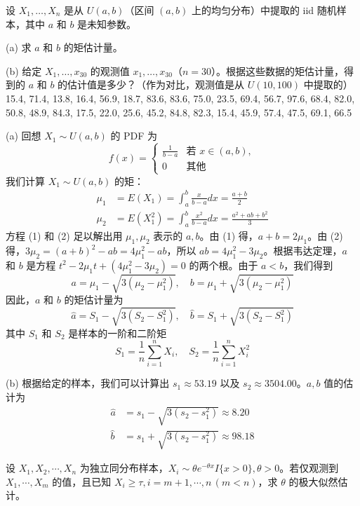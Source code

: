 \begin{questions}
\question 设 $X_1, \dots, X_n$ 是从 $U(a, b)$（区间 $(a, b)$ 上的均匀分布）中提取的 iid 随机样本，其中 $a$ 和 $b$ 是未知参数。

(a) 求 $a$ 和 $b$ 的矩估计量。

(b) 给定 $X_1, \dots, x_{30}$ 的观测值 $x_1, \dots, x_{30}$（$n = 30$）。根据这些数据的矩估计量，得到的 $a$ 和 $b$ 的估计值是多少？（作为对比，观测值是从 $U(10, 100)$ 中提取的）
15.4, 71.4, 13.8, 16.4, 56.9, 18.7, 83.6, 83.6, 75.0, 23.5, 69.4, 56.7, 97.6, 68.4, 82.0, 50.8, 48.9, 84.3, 17.5, 22.0, 25.6, 45.2, 84.8, 82.3, 15.4, 45.9, 57.4, 47.5, 69.1, 66.5

\begin{solution}
(a) 回想 $X_1 \sim U(a, b)$ 的 PDF 为
\[
f(x) = \begin{cases} \frac{1}{b - a} & \text{若 } x \in (a, b), \\ 0 & \text{其他} \end{cases}
\]
我们计算 $X_1 \sim U(a, b)$ 的矩：
\begin{align*}
\mu_1 &= E(X_1) = \int_a^b \frac{x}{b - a} dx = \frac{a + b}{2} \\
\mu_2 &= E(X_1^2) = \int_a^b \frac{x^2}{b - a} dx = \frac{a^2 + ab + b^2}{3}
\end{align*}
方程 (1) 和 (2) 足以解出用 $\mu_1, \mu_2$ 表示的 $a, b$。由 (1) 得，$a + b = 2\mu_1$。由 (2) 得，$3\mu_2 = (a + b)^2 - ab = 4\mu_1^2 - ab$，所以 $ab = 4\mu_1^2 - 3\mu_2$。根据韦达定理，$a$ 和 $b$ 是方程 $t^2 - 2\mu_1 t + \left(4\mu_1^2 - 3\mu_2\right) = 0$ 的两个根。由于 $a < b$，我们得到
\[
a = \mu_1 - \sqrt{3\left(\mu_2 - \mu_1^2\right)}, \quad b = \mu_1 + \sqrt{3\left(\mu_2 - \mu_1^2\right)}
\]
因此，$a$ 和 $b$ 的矩估计量为
\[
\hat{a} = S_1 - \sqrt{3\left(S_2 - S_1^2\right)}, \quad \hat{b} = S_1 + \sqrt{3\left(S_2 - S_1^2\right)}
\]
其中 $S_1$ 和 $S_2$ 是样本的一阶和二阶矩
\[
S_1 = \frac{1}{n} \sum_{i=1}^n X_i, \quad S_2 = \frac{1}{n} \sum_{i=1}^n X_i^2
\]

(b) 根据给定的样本，我们可以计算出 $s_1 \approx 53.19$ 以及 $s_2 \approx 3504.00$。$a, b$ 值的估计为
\begin{align*}
\hat{a} &= s_1 - \sqrt{3\left(s_2 - s_1^2\right)} \approx 8.20 \\
\hat{b} &= s_1 + \sqrt{3\left(s_2 - s_1^2\right)} \approx 98.18
\end{align*}
\end{solution}

\question 设 $X_1, X_2, \cdots, X_n$ 为独立同分布样本，$X_i \sim \theta e^{-\theta x} I\{x > 0\}, \theta > 0$。若仅观测到 $X_1, \cdots, X_m$ 的值，且已知 $X_i \ge \tau, i = m+1, \cdots, n \, (m < n)$，求 $\theta$ 的极大似然估计。


\end{questions}
